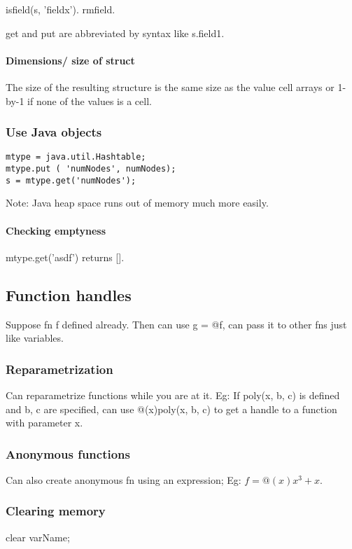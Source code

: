 \documentclass[oneside, article]{memoir}
\begin{document}
isfield(s, 'fieldx'). rmfield.

get and put are abbreviated by syntax like s.field1.

\paragraph*{Dimensions/ size of struct}
The size of the resulting structure is the same size as the value cell arrays or 1-by-1 if none of the values is a cell.

\subsubsection{Use Java objects}
\begin{verbatim}
mtype = java.util.Hashtable;
mtype.put ( 'numNodes', numNodes);
s = mtype.get('numNodes');
\end{verbatim}

Note: Java heap space runs out of memory much more easily.

\paragraph*{Checking emptyness}
mtype.get('asdf') returns [].

\subsection{Function handles}
Suppose fn f defined already. Then can use g = @f, can pass it to other fns just like variables.

\subsubsection{Reparametrization}
Can reparametrize functions while you are at it. Eg: If poly(x, b, c) is defined and b, c are specified, can use @(x)poly(x, b, c) to get a handle to a function with parameter x.

\subsubsection{Anonymous functions}
Can also create anonymous fn using an expression; Eg: $f = @(x)x^3+x$.

\subsubsection{Clearing memory}
clear varName;
\end{document}
